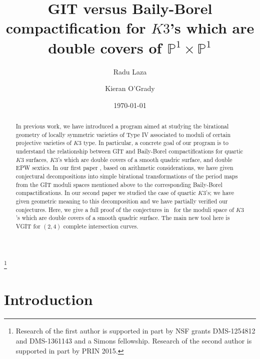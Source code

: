 \documentclass[11pt]{amsart}
\numberwithin{equation}{section}
\theoremstyle{plain}
\theoremstyle{remark}
\theoremstyle{definition}
\newcommand{\PP}{{\mathbb P}}
\begin{document}
 \title[Moduli hyperelliptic quartics]{GIT versus Baily-Borel compactification for $K3$'s which are  double covers of $\PP^1\times\PP^1$}
 
 \author[R. Laza]{Radu Laza}
\address{Stony Brook University,  Stony Brook, NY 11794, USA}

 \author[K. O'Grady]{Kieran O'Grady}
\address{``Sapienza'' Universit\'a di Roma, Rome, Italy}
\date{\today}

\begin{abstract}
In previous work, we have introduced a program aimed at studying the birational  geometry of locally symmetric varieties of Type IV associated to moduli of certain projective varieties of $K3$ type.
In particular, a concrete goal of our program is to understand the relationship between GIT and Baily-Borel compactifications for quartic $K3$ surfaces, $K3$'s which are double covers of a smooth quadric surface, and double EPW sextics.  In our first paper \cite{log1}, based on arithmetic considerations, we have given conjectural decompositions into simple birational transformations of the period maps from the GIT moduli spaces mentioned above  to the corresponding Baily-Borel compactifications. In our second paper \cite{log2} we studied the case of quartic $K3$'s; we have given geometric meaning to this decomposition and we have  partially verified our conjectures. Here, we give a full proof of the conjectures in~\cite{log1} for the moduli space of  $K3$'s which are double covers of a smooth quadric surface. The main new tool here is VGIT for $(2,4)$ complete intersection curves.
\end{abstract}



\thanks{Research of the first author is supported in part by NSF grants DMS-1254812 and DMS-1361143 and a Simons fellowship. Research of the second author is supported in part by PRIN 2015.}
  \maketitle
  


\section{Introduction}
%
\end{document}
